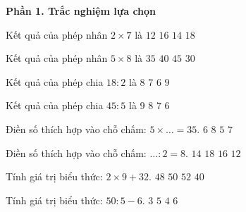 \textbf{Phần 1. Trắc nghiệm lựa chọn}

\begin{ex} %
Kết quả của phép nhân $2 \times 7$ là
\choice
{$12$}
{$16$}
{\True $14$}
{$18$}
\end{ex}

\begin{ex} %
Kết quả của phép nhân $5 \times 8$ là
\choice
{$35$}
{\True $40$}
{$45$}
{$30$}
\end{ex}

\begin{ex} %
Kết quả của phép chia $18 : 2$ là
\choice
{$8$}
{$7$}
{$6$}
{\True $9$}
\end{ex}

\begin{ex} %
Kết quả của phép chia $45 : 5$ là
\choice
{\True $9$}
{$8$}
{$7$}
{$6$}
\end{ex}

\begin{ex} %
Điền số thích hợp vào chỗ chấm: $5 \times \dots = 35$.
\choice
{$6$}
{$8$}
{$5$}
{\True $7$}
\end{ex}

\begin{ex} %
Điền số thích hợp vào chỗ chấm: $\dots : 2 = 8$.
\choice
{$14$}
{$18$}
{\True $16$}
{$12$}
\end{ex}

\begin{ex} %
Tính giá trị biểu thức: $2 \times 9 + 32$.
\choice
{$48$}
{\True $50$}
{$52$}
{$40$}
\end{ex}

\begin{ex} %
Tính giá trị biểu thức: $50 : 5 - 6$.
\choice
{$3$}
{$5$}
{\True $4$}
{$6$}
\end{ex}

